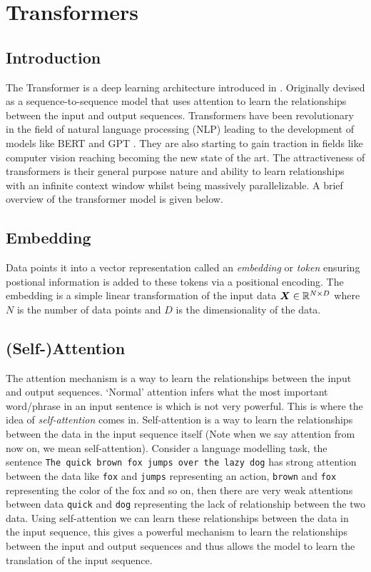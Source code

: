\documentclass[../../main.tex]{subfiles}
\begin{document}
\section{Transformers}
\subsection{Introduction}

The Transformer is a deep learning architecture introduced in \parencite{vaswani2017attention}. Originally devised as a sequence-to-sequence model that uses attention to learn the relationships between the input and output sequences. Transformers have been revolutionary in the field of natural language processing (NLP) leading to the development of models like BERT \parencite{devlin2019bert} and GPT \parencite{brown2020language}. They are also starting to gain traction in fields like computer vision \parencite{dosovitskiy2021image} reaching becoming the new state of the art. The attractiveness of transformers is their general purpose nature and ability to learn relationships with an infinite context window whilst being massively parallelizable. A brief overview of the transformer model is given below.


\subsection{Embedding}

Data points it into a vector representation called an \emph{embedding} or \emph{token} ensuring postional information is added to these tokens via a positional encoding. The embedding is a simple linear transformation of the input data $\bm{X} \in \mathbb{R}^{N \times D}$ where $N$ is the number of data points and $D$ is the dimensionality of the data. 

\subsection{(Self-)Attention}

The attention mechanism is a way to learn the relationships between the input and output sequences. `Normal' attention infers what the most important word/phrase in an input sentence is which is not very powerful. This is where the idea of \emph{self-attention} comes in. Self-attention is a way to learn the relationships between the data in the input sequence itself (Note when we say attention from now on, we mean self-attention).  Consider a language modelling task, the sentence \texttt{The quick brown fox jumps over the lazy dog} has strong attention between the data like \texttt{fox} and \texttt{jumps} representing an action, \texttt{brown} and \texttt{fox} representing the color of the fox and so on, then there are very weak attentions between data \texttt{quick} and \texttt{dog} representing the lack of relationship between the two data. Using self-attention we can learn these relationships between the data in the input sequence, this gives a powerful mechanism to learn the relationships between the input and output sequences and thus allows the model to learn the translation of the input sequence.
\end{document}
